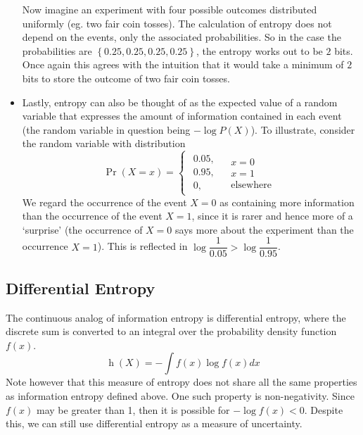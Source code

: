 \documentclass[11pt]{report} %
\begin{document}
\begin{itemize}
Now imagine an experiment with four possible outcomes distributed uniformly (eg. two fair coin tosses). The calculation of entropy does not depend on the events, only the associated probabilities. So in the case the probabilities are $\left\{0.25, 0.25, 0.25, 0.25\right\}$, the entropy works out to be $2$ bits. Once again this agrees with the intuition that it would take a minimum of $2$ bits to store the outcome of two fair coin tosses.
\item Lastly, entropy can also be thought of as the expected value of a random variable that expresses the amount of information contained in each event (the random variable in question being $-\log P\left(X\right)$). To illustrate, consider the random variable with distribution
\begin{equation}
\operatorname{Pr}\left(X = x\right) = \begin{cases}
\begin{array}{c}
0.05,\\
0.95,\\
0,
\end{array} & \begin{array}{c}
x=0\\
x=1\\
\text{elsewhere}
\end{array}\end{cases}
\end{equation}
We regard the occurrence of the event $X = 0$ as containing more information than the occurrence of the event $X = 1$, since it is rarer and hence more of a `surprise' (the occurrence of $X = 0$ says more about the experiment than the occurrence $X = 1$). This is reflected in $\log\dfrac{1}{0.05} > \log\dfrac{1}{0.95}$.
\end{itemize}


\subsection{Differential Entropy}

The continuous analog of information entropy is differential entropy, where the discrete sum is converted to an integral over the probability density function $f\left(x\right)$.
\begin{equation}
\operatorname{h}\left(X\right) = -\int f\left(x\right)\log f\left(x\right) dx
\end{equation}
Note however that this measure of entropy does not share all the same properties as information entropy defined above. One such property is non-negativity. Since $f\left(x\right)$ may be greater than 1, then it is possible for $-\log f\left(x\right) < 0$. Despite this, we can still use differential entropy as a measure of uncertainty.
\end{document}
